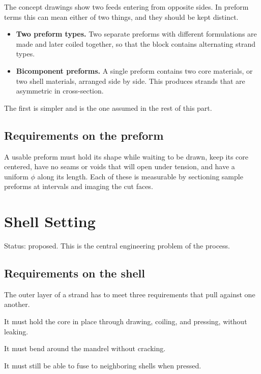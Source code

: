 \documentclass[11pt,openany]{book}
\theoremstyle{definition}
\begin{document}
The concept drawings show two feeds entering from opposite sides. In preform terms this can mean either of two things, and they should be kept distinct.

\begin{itemize}
\item \textbf{Two preform types.} Two separate preforms with different formulations are made and later coiled together, so that the block contains alternating strand types.
\item \textbf{Bicomponent preforms.} A single preform contains two core materials, or two shell materials, arranged side by side. This produces strands that are asymmetric in cross-section.
\end{itemize}

The first is simpler and is the one assumed in the rest of this part.

\section{Requirements on the preform}

A usable preform must hold its shape while waiting to be drawn, keep its core centered, have no seams or voids that will open under tension, and have a uniform $\phi$ along its length. Each of these is measurable by sectioning sample preforms at intervals and imaging the cut faces.

\chapter{Shell Setting}\label{ch:shell}

Status: proposed. This is the central engineering problem of the process.

\section{Requirements on the shell}

The outer layer of a strand has to meet three requirements that pull against one another.

\begin{description}[leftmargin=1.5em]
\item[Containment.] It must hold the core in place through drawing, coiling, and pressing, without leaking.
\item[Flexibility.] It must bend around the mandrel without cracking.
\item[Bondability.] It must still be able to fuse to neighboring shells when pressed.
\end{description}
\end{document}
